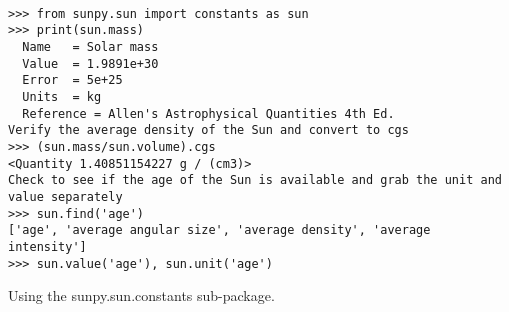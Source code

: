 \begin{listing}[H]
\begin{verbatim}

>>> from sunpy.sun import constants as sun
>>> print(sun.mass)
  Name   = Solar mass
  Value  = 1.9891e+30
  Error  = 5e+25
  Units  = kg
  Reference = Allen's Astrophysical Quantities 4th Ed.
Verify the average density of the Sun and convert to cgs
>>> (sun.mass/sun.volume).cgs
<Quantity 1.40851154227 g / (cm3)>
Check to see if the age of the Sun is available and grab the unit and value separately
>>> sun.find('age')
['age', 'average angular size', 'average density', 'average intensity']
>>> sun.value('age'), sun.unit('age')

\end{verbatim}
\caption{Using the sunpy.sun.constants sub-package.}
\label{code:constants_code}
\end{listing}
	